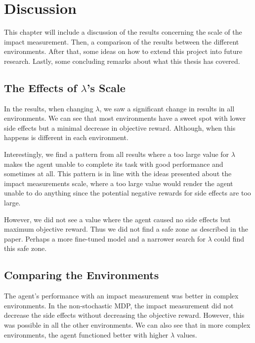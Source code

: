 \documentclass[12pt,A4]{report}
\theoremstyle{definition}
\begin{document}

\chapter{Discussion}

This chapter will include a discussion of the results concerning the scale of the impact measurement. Then, a comparison of the results between the different environments. After that, some ideas on how to extend this project into future research. Lastly, some concluding remarks about what this thesis has covered.

\section{The Effects of $\lambda$'s Scale}
In the results, when changing $\lambda$, we saw a significant change in results in all environments. We can see that most environments have a sweet spot with lower side effects but a minimal decrease in objective reward. Although, when this happens is different in each environment. 

Interestingly, we find a pattern from all results where a too large value for $\lambda$ makes the agent unable to complete its task with good performance and sometimes at all. This pattern is in line with the ideas presented \citet{ArmstrongLevinstein} about the impact measurements scale, where a too large value would render the agent unable to do anything since the potential negative rewards for side effects are too large. 

However, we did not see a value where the agent caused no side effects but maximum objective reward. Thus we did not find a safe zone as described in the paper. Perhaps a more fine-tuned model and a narrower search for $\lambda$ could find this safe zone.

\section{Comparing the Environments}
The agent's performance with an impact measurement was better in complex environments. In the non-stochastic MDP, the impact measurement did not decrease the side effects without decreasing the objective reward. However, this was possible in all the other environments. We can also see that in more complex environments, the agent functioned better with higher $\lambda$ values.
\end{document}

